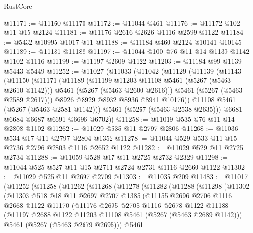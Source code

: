 \begin{lexlean}{RustCore}
\begin{coremodule}
@11171 := @11160 @11170
@11172 := @11044 @461
@11176 := @11172 @102 @11 @15 @2124
@11181 := @11176 @2616 @2626 @1116 @2599 @1122
@11184 := @5432 @10995 @1017 @11
@11188 := @11184 @460 @2124 @10141 @10145
@11189 := @11181 @11188
@11197 := @11044 @100 @76 @11 @14 @1139 @1142 @1102 @1116
@11199 := @11197 @2609 @1122
@11203 := @11184 @99 @1139 @5443 @5449
@11252 := @11027
    (@11033
      (@11042
        (@11129
          (@11139
            (@11143
              (@11150
                (@11171
                  (@11189
                    (@11199 @11203 @11108 @5461 (@5267 (@5463 @2610 @1142)))
                    @5461
                    (@5267 (@5463 @2600 @2616)))
                  @5461
                  (@5267 (@5463 @2589 @2617)))
                @8926
                @8929
                @8932
                @8936
                @8941
                @10176))
            @11108
            @5461
            (@5267 (@5463 @2581 @1142)))
          @5461
          (@5267 (@5463 @2538 @2635)))
        @6681
        @6684
        @6687
        @6691
        @6696
        @6702))
@11258 := @11019 @535 @76 @11 @14 @2808 @1102
@11262 := @11029 @535 @11 @2797 @2806
@11268 := @11036 @534 @17 @11 @2797 @2804 @1352
@11278 := @11044 @529 @533 @11 @15 @2736 @2796 @2803 @1116 @2652 @1122
@11282 := @11029 @529 @11 @2725 @2734
@11288 := @11059 @528 @17 @11 @2725 @2732 @2329
@11298 := @11044 @525 @527 @11 @15 @2711 @2724 @2731 @1116 @2660 @1122
@11302 := @11029 @525 @11 @2697 @2709
@11303 := @11035 @209
@11483 := @11017
    (@11252
      (@11258
        (@11262
          (@11268
            (@11278
              (@11282
                (@11288
                  (@11298
                    (@11302
                      (@11303
                        @518
                        @18
                        @11
                        @2697
                        @2707
                        @1385
                        (@11155
                          @2696
                          @2706
                          @1116
                          @2668
                          @1122
                          @11170
                          (@11176
                            @2695
                            @2705
                            @1116
                            @2678
                            @1122
                            @11188
                            (@11197 @2688 @1122 @11203 @11108 @5461 (@5267 (@5463 @2689 @1142)))
                            @5461
                            (@5267 (@5463 @2679 @2695)))
                          @5461

\end{coremodule}
\end{lexlean}
